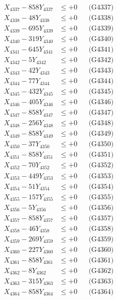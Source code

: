 \documentclass[a4paper,10pt]{article}
\begin{document}
{\begin{align}
X_{4337} - 858Y_{4337} &\leq +0 && \text{(G4337)} \\
X_{4338} - 48Y_{4338} &\leq +0 && \text{(G4338)} \\
X_{4339} - 695Y_{4339} &\leq +0 && \text{(G4339)} \\
X_{4340} - 319Y_{4340} &\leq +0 && \text{(G4340)} \\
\allowbreak
X_{4341} - 645Y_{4341} &\leq +0 && \text{(G4341)} \\
X_{4342} - 5Y_{4342} &\leq +0 && \text{(G4342)} \\
X_{4343} - 42Y_{4343} &\leq +0 && \text{(G4343)} \\
X_{4344} - 77Y_{4344} &\leq +0 && \text{(G4344)} \\
X_{4345} - 432Y_{4345} &\leq +0 && \text{(G4345)} \\
X_{4346} - 405Y_{4346} &\leq +0 && \text{(G4346)} \\
X_{4347} - 858Y_{4347} &\leq +0 && \text{(G4347)} \\
X_{4348} - 256Y_{4348} &\leq +0 && \text{(G4348)} \\
X_{4349} - 858Y_{4349} &\leq +0 && \text{(G4349)} \\
X_{4350} - 37Y_{4350} &\leq +0 && \text{(G4350)} \\
\allowbreak
X_{4351} - 858Y_{4351} &\leq +0 && \text{(G4351)} \\
X_{4352} - 70Y_{4352} &\leq +0 && \text{(G4352)} \\
X_{4353} - 449Y_{4353} &\leq +0 && \text{(G4353)} \\
X_{4354} - 51Y_{4354} &\leq +0 && \text{(G4354)} \\
X_{4355} - 157Y_{4355} &\leq +0 && \text{(G4355)} \\
X_{4356} - 5Y_{4356} &\leq +0 && \text{(G4356)} \\
X_{4357} - 858Y_{4357} &\leq +0 && \text{(G4357)} \\
X_{4358} - 46Y_{4358} &\leq +0 && \text{(G4358)} \\
X_{4359} - 269Y_{4359} &\leq +0 && \text{(G4359)} \\
X_{4360} - 227Y_{4360} &\leq +0 && \text{(G4360)} \\
\allowbreak
X_{4361} - 858Y_{4361} &\leq +0 && \text{(G4361)} \\
X_{4362} - 8Y_{4362} &\leq +0 && \text{(G4362)} \\
X_{4363} - 315Y_{4363} &\leq +0 && \text{(G4363)} \\
X_{4364} - 858Y_{4364} &\leq +0 && \text{(G4364)} \\

\end{align}}
\end{document}
